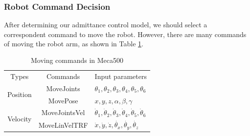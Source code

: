\subsubsection{Robot Command Decision}
\hspace*{6mm}After determining our admittance control model, we should select a correspondent command to move the robot. However, there are many commands of moving the robot arm, as shown in Table \ref{tab:commands}.
\begin{table}[htbp]
\centering
\caption{Moving commands in Meca500}
\label{tab:commands}
\begin{tabular}{c|c|l} 
\hline \hline
Types										&Commands			&Input parameters\\
\cline{1-3}
\multirow{2}{*}{Position}					&MoveJoints			&\noindent $\theta _1, \theta _2 ,\theta _3 ,\theta _4 ,\theta _5 , \theta _6 $\\\cline{2-3}
											&MovePose			&\noindent$x,y,z,\alpha ,\beta ,\gamma $\\
\cline{1-3}
\multirow{2}{*}{Velocity}					&MoveJointsVel		&$\dot{\theta}_1, \dot{\theta}_2, \dot{\theta}_3,\dot{\theta}_4, \dot{\theta}_5 , \dot{\theta}_6 $\\\cline{2-3}
											&MoveLinVelTRF		&$\dot{x},\dot{y},\dot{z},\dot{\theta _x},\dot{\theta _y},\dot{\theta _z}$\\
\hline \hline
\end{tabular}
\end{table}



